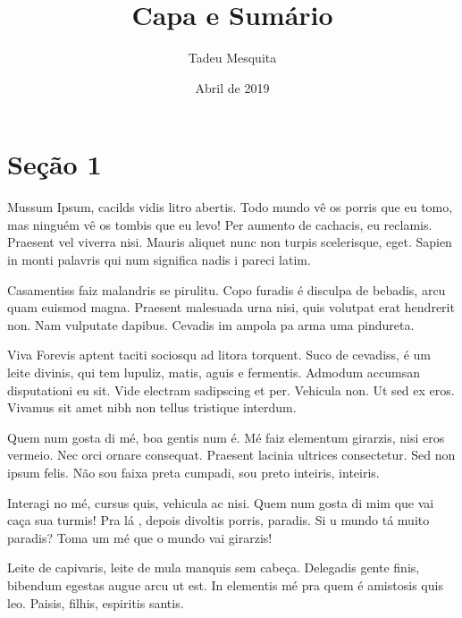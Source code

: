 \documentclass{article}
\begin{document}
	
	\title{\textbf{{\Huge Capa e Sumário}}} %
	\author{Tadeu Mesquita} %
	\date{Abril de 2019} %
	\maketitle %
	\thispagestyle{empty} %
	\newpage
	
	\setcounter{page}{1} %
	\tableofcontents %
	\newpage
	
	
	\setcounter{page}{1} %
	\section{Seção 1}
	
	Mussum Ipsum, cacilds vidis litro abertis. Todo mundo vê os porris que eu tomo, mas ninguém vê os tombis que eu levo! Per aumento de cachacis, eu reclamis. Praesent vel viverra nisi. Mauris aliquet nunc non turpis scelerisque, eget. Sapien in monti palavris qui num significa nadis i pareci latim.
	
	Casamentiss faiz malandris se pirulitu. Copo furadis é disculpa de bebadis, arcu quam euismod magna. Praesent malesuada urna nisi, quis volutpat erat hendrerit non. Nam vulputate dapibus. Cevadis im ampola pa arma uma pindureta.
	
	Viva Forevis aptent taciti sociosqu ad litora torquent. Suco de cevadiss, é um leite divinis, qui tem lupuliz, matis, aguis e fermentis. Admodum accumsan disputationi eu sit. Vide electram sadipscing et per. Vehicula non. Ut sed ex eros. Vivamus sit amet nibh non tellus tristique interdum.
	
	Quem num gosta di mé, boa gentis num é. Mé faiz elementum girarzis, nisi eros vermeio. Nec orci ornare consequat. Praesent lacinia ultrices consectetur. Sed non ipsum felis. Não sou faixa preta cumpadi, sou preto inteiris, inteiris.
	
	Interagi no mé, cursus quis, vehicula ac nisi. Quem num gosta di mim que vai caça sua turmis! Pra lá , depois divoltis porris, paradis. Si u mundo tá muito paradis? Toma um mé que o mundo vai girarzis!
	
	Leite de capivaris, leite de mula manquis sem cabeça. Delegadis gente finis, bibendum egestas augue arcu ut est. In elementis mé pra quem é amistosis quis leo. Paisis, filhis, espiritis santis.
	
\end{document}
